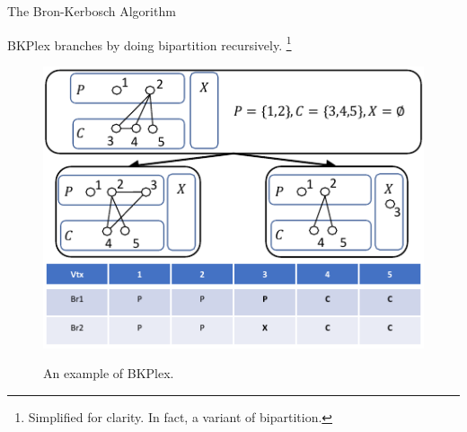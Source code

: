 \documentclass[9pt]{beamer} %
\begin{document}
\begin{frame}{The Bron-Kerbosch Algorithm}
    \begin{center}
        BKPlex branches by doing bipartition recursively. \footnote{Simplified for clarity. In fact, a variant of bipartition.}
    \end{center}
    \begin{figure}
    \includegraphics[width=0.65\linewidth]{pic/bkrec.pdf}\\
    \caption{An example of BKPlex.}
\end{figure}
\end{frame}
\end{document}
